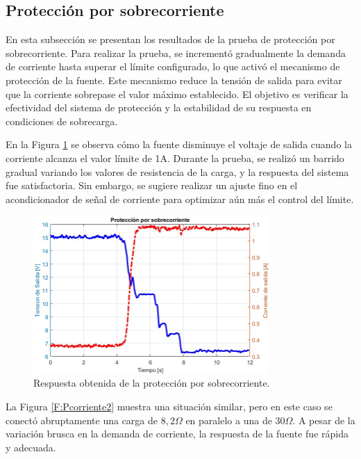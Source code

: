 \subsection{Protección por sobrecorriente}
En esta subsección se presentan los resultados de la prueba de protección por sobrecorriente. Para realizar la prueba, se incrementó gradualmente la demanda de corriente hasta superar el límite configurado, lo que activó el mecanismo de protección de la fuente. Este mecanismo reduce la tensión de salida para evitar que la corriente sobrepase el valor máximo establecido. El objetivo es verificar la efectividad del sistema de protección y la estabilidad de su respuesta en condiciones de sobrecarga. \par 
En la Figura \ref{F:Pcorriente1} se observa cómo la fuente disminuye el voltaje de salida cuando la corriente alcanza el valor límite de 1A. Durante la prueba, se realizó un barrido gradual variando los valores de resistencia de la carga, y la respuesta del sistema fue satisfactoria. Sin embargo, se sugiere realizar un ajuste fino en el acondicionador de señal de corriente para optimizar aún más el control del límite.\par 

\begin{figure}[H]
    \centering
    \includegraphics[width=0.8\textwidth]{./imagenes/MedicionConPuntaCorriente_proteccion.jpg}
    \caption{Respuesta obtenida de la protección por sobrecorriente.}
    \label{F:Pcorriente1}
\end{figure}\par 

La Figura \ref{F:Pcorriente2} muestra una situación similar, pero en este caso se conectó abruptamente una carga de $8,2\Omega$ en paralelo a una de $30\Omega$. A pesar de la variación brusca en la demanda de corriente, la respuesta de la fuente fue rápida y adecuada.\par 

